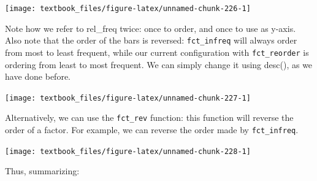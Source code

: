 \documentclass[]{tufte-book}
\newenvironment{Shaded}{}{}
\newcommand{\DataTypeTok}[1]{\textcolor[rgb]{0.56,0.13,0.00}{#1}}
\newcommand{\KeywordTok}[1]{\textcolor[rgb]{0.00,0.44,0.13}{\textbf{#1}}}
\newcommand{\NormalTok}[1]{#1}
\newcommand{\OperatorTok}[1]{\textcolor[rgb]{0.40,0.40,0.40}{#1}}
\newcommand{\StringTok}[1]{\textcolor[rgb]{0.25,0.44,0.63}{#1}}
\begin{document}
\texttt{[image: textbook\_files/figure-latex/unnamed-chunk-226-1]}

Note how we refer to rel\_freq twice: once to order, and once to use as y-axis. Also note that the order of the bars is reversed: \texttt{fct\_infreq} will always order from most to least frequent, while our current configuration with \texttt{fct\_reorder} is ordering from least to most frequent. We can simply change it using desc(), as we have done before.

\begin{Shaded}
\end{Shaded}

\texttt{[image: textbook\_files/figure-latex/unnamed-chunk-227-1]}

Alternatively, we can use the \texttt{fct\_rev} function: this function will reverse the order of a factor. For example, we can reverse the order made by \texttt{fct\_infreq}.

\begin{Shaded}
\end{Shaded}

\texttt{[image: textbook\_files/figure-latex/unnamed-chunk-228-1]}

Thus, summarizing:
\end{document}
